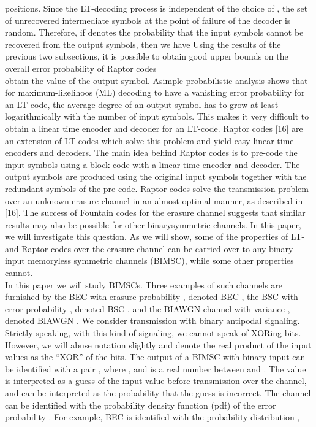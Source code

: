 \documentclass[12pt,a4paper,titlepage,twocolumn]{article}
\begin{document}
positions. Since the LT-decoding process is independent of the
choice of , the set of unrecovered intermediate symbols at the
point of failure of the decoder is random. Therefore, if denotes
the probability that the input symbols cannot be recovered
from the output symbols, then we have
Using the results of the previous two subsections, it is possible
to obtain good upper bounds on the overall error probability of
Raptor codes\\
obtain
the value of the output symbol.
Asimple probabilistic analysis shows that for maximum-likelihoos
(ML) decoding to have a vanishing error probability for
an LT-code, the average degree of an output symbol has to grow
at least logarithmically with the number of input symbols. This
makes it very difficult to obtain a linear time encoder and decoder
for an LT-code. Raptor codes [16] are an extension of
LT-codes which solve this problem and yield easy linear time
encoders and decoders. The main idea behind Raptor codes is to
pre-code the input symbols using a block code with a linear time
encoder and decoder. The output symbols are produced using
the original input symbols together with the redundant symbols
of the pre-code. Raptor codes solve the transmission problem
over an unknown erasure channel in an almost optimal manner,
as described in [16].
The success of Fountain codes for the erasure channel suggests
that similar results may also be possible for other binarysymmetric
channels. In this paper, we will investigate this question.
As we will show, some of the properties of LT- and Raptor
codes over the erasure channel can be carried over to any binary
input memoryless symmetric channels (BIMSC), while some
other properties cannot. \\
In this paper we will study BIMSCs. Three examples of such
channels are furnished by the BEC with erasure probability
, denoted BEC , the BSC with error probability , denoted
BSC , and the BIAWGN channel with variance , denoted
BIAWGN .
We consider transmission with binary antipodal signaling.
Strictly speaking, with this kind of signaling, we cannot speak
of XORing bits. However, we will abuse notation slightly and denote
the real product of the input values as the “XOR” of the bits.
The output of a BIMSC with binary input can be
identified with a pair , where , and is a
real number between and . The value is interpreted as
a guess of the input value before transmission over the channel,
and can be interpreted as the probability that the guess is incorrect.
The channel can be identified with the probability density
function (pdf) of the error probability . For example, BEC is
identified with the probability distribution ,\\
\end{document}
